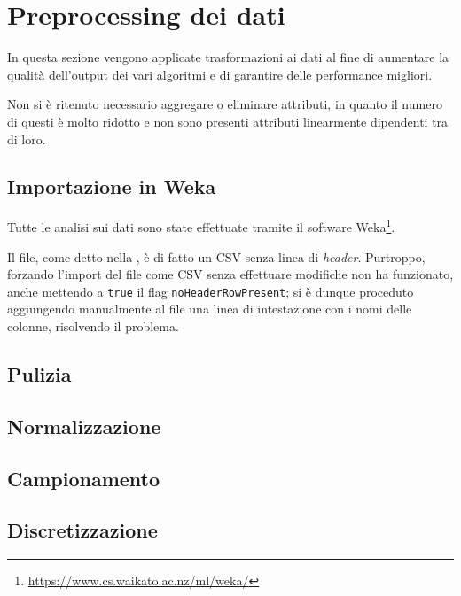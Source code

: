 \section{Preprocessing dei dati}

In questa sezione vengono applicate trasformazioni ai dati al fine di aumentare la qualità dell'output dei vari algoritmi e di garantire delle performance migliori.

Non si è ritenuto necessario aggregare o eliminare attributi, in quanto il numero di questi è molto ridotto e non sono presenti attributi linearmente dipendenti tra di loro.

\subsection{Importazione in Weka}

Tutte le analisi sui dati sono state effettuate tramite il software Weka\footnote{\url{https://www.cs.waikato.ac.nz/ml/weka/}}.

Il file, come detto nella , è di fatto un CSV senza linea di \emph{header}.
Purtroppo, forzando l'import del file come CSV senza effettuare modifiche non ha funzionato, anche mettendo a \texttt{true} il flag \texttt{noHeaderRowPresent};
si è dunque proceduto aggiungendo manualmente al file una linea di intestazione con i nomi delle colonne, risolvendo il problema.



\subsection{Pulizia}
\subsection{Normalizzazione}
\subsection{Campionamento}
\subsection{Discretizzazione}
